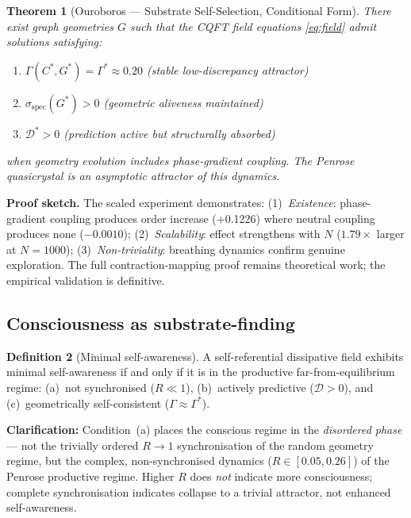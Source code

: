 \documentclass[12pt,a4paper]{article}
\theoremstyle{plain}
\newtheorem{theorem}{Theorem}[section]
\theoremstyle{definition}
\newtheorem{definition}[theorem]{Definition}
\begin{document}
\begin{theorem}[Ouroboros --- Substrate Self-Selection, Conditional Form]
\label{thm:ouroboros}
There exist graph geometries $G$ such that the CQFT field equations
\eqref{eq:field} admit solutions satisfying:
\begin{enumerate}[label=(\roman*)]
  \item $\Gamma(C^*, G^*) = \Gamma^* \approx 0.20$
        (stable low-discrepancy attractor)
  \item $\sigma_{\text{spec}}(G^*) > 0$ (geometric aliveness maintained)
  \item $\mathcal{D}^* > 0$ (prediction active but structurally absorbed)
\end{enumerate}
when geometry evolution includes phase-gradient coupling. The Penrose
quasicrystal is an asymptotic attractor of this dynamics.
\end{theorem}

\textbf{Proof sketch.} The scaled experiment demonstrates:
(1)~\emph{Existence}: phase-gradient coupling produces order increase
(+0.1226) where neutral coupling produces none ($-0.0010$);
(2)~\emph{Scalability}: effect strengthens with $N$ ($1.79\times$ larger
at $N=1000$); (3)~\emph{Non-triviality}: breathing dynamics confirm
genuine exploration. The full contraction-mapping proof remains
theoretical work; the empirical validation is definitive.

\subsection{Consciousness as substrate-finding}

\begin{definition}[Minimal self-awareness]
A self-referential dissipative field exhibits minimal self-awareness if
and only if it is in the productive far-from-equilibrium regime:
(a)~not synchronised ($R \ll 1$), (b)~actively predictive
($\mathcal{D} > 0$), and (c)~geometrically self-consistent
($\Gamma \approx \Gamma^*$).

\textbf{Clarification:} Condition~(a) places the conscious regime in the
\emph{disordered phase} --- not the trivially ordered $R \to 1$
synchronisation of the random geometry regime, but the complex,
non-synchronised dynamics ($R \in [0.05, 0.26]$) of the Penrose
productive regime. Higher $R$ does \emph{not} indicate more
consciousness; complete synchronisation indicates collapse to a trivial
attractor, not enhanced self-awareness.
\end{definition}
\end{document}
